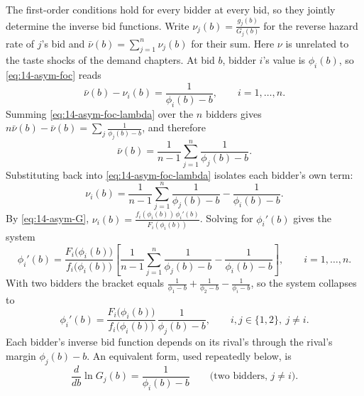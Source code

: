 The first-order conditions hold for every bidder at every bid, so they jointly determine the inverse
bid functions. Write $\nu_j(b)=\frac{g_j(b)}{G_j(b)}$ for the reverse hazard rate of $j$'s bid and
$\bar\nu(b)=\sum_{j=1}^{n}\nu_j(b)$ for their sum. Here $\nu$ is unrelated to the taste shocks of
the demand chapters. At bid $b$, bidder $i$'s value is $\phi_i(b)$, so
\eqref{eq:14-asym-foc} reads
\begin{equation}\label{eq:14-asym-foc-lambda}
\bar\nu(b)-\nu_i(b)=\frac{1}{\phi_i(b)-b},\qquad i=1,\dots,n .
\end{equation}
Summing \eqref{eq:14-asym-foc-lambda} over the $n$ bidders gives
$n\bar\nu(b)-\bar\nu(b)=\sum_{j}\frac{1}{\phi_j(b)-b}$, and therefore
\[
\bar\nu(b)=\frac{1}{n-1}\sum_{j=1}^{n}\frac{1}{\phi_j(b)-b}.
\]
Substituting back into \eqref{eq:14-asym-foc-lambda} isolates each bidder's own term:
\[
\nu_i(b)=\frac{1}{n-1}\sum_{j=1}^{n}\frac{1}{\phi_j(b)-b}-\frac{1}{\phi_i(b)-b}.
\]
By \eqref{eq:14-asym-G}, $\nu_i(b)=\frac{f_i(\phi_i(b))\,\phi_i'(b)}{F_i(\phi_i(b))}$. Solving for
$\phi_i'(b)$ gives the system
\begin{equation}\label{eq:14-asym-ode}
\phi_i'(b)=\frac{F_i\bigl(\phi_i(b)\bigr)}{f_i\bigl(\phi_i(b)\bigr)}
\left[\frac{1}{n-1}\sum_{j=1}^{n}\frac{1}{\phi_j(b)-b}-\frac{1}{\phi_i(b)-b}\right],\qquad i=1,\dots,n.
\end{equation}
With two bidders the bracket equals $\frac{1}{\phi_1-b}+\frac{1}{\phi_2-b}-\frac{1}{\phi_i-b}$, so
the system collapses to
\begin{equation}\label{eq:14-asym-ode2}
\phi_i'(b)=\frac{F_i\bigl(\phi_i(b)\bigr)}{f_i\bigl(\phi_i(b)\bigr)}\,\frac{1}{\phi_j(b)-b},\qquad
i,j\in\{1,2\},\ j\neq i .
\end{equation}
Each bidder's inverse bid function depends on its rival's through the rival's margin
$\phi_j(b)-b$. An equivalent form, used repeatedly below, is
\begin{equation}\label{eq:14-asym-logG}
\frac{d}{db}\ln G_j(b)=\frac{1}{\phi_i(b)-b}\qquad\text{(two bidders, } j\neq i\text{)} .
\end{equation}

